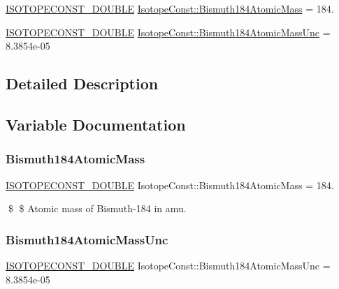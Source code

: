 \begin{DoxyCompactItemize}
\item 
\mbox{\hyperlink{group___isotope_const-_macros_ga8f45a7272ce02c0b4c65c44636ed719a}{I\+S\+O\+T\+O\+P\+E\+C\+O\+N\+S\+T\+\_\+\+D\+O\+U\+B\+LE}} \mbox{\hyperlink{group___isotope_const-_bismuth-_bi184_gabecca31c4b417fb3d773e23a5566c901}{Isotope\+Const\+::\+Bismuth184\+Atomic\+Mass}} = 184.
\item 
\mbox{\hyperlink{group___isotope_const-_macros_ga8f45a7272ce02c0b4c65c44636ed719a}{I\+S\+O\+T\+O\+P\+E\+C\+O\+N\+S\+T\+\_\+\+D\+O\+U\+B\+LE}} \mbox{\hyperlink{group___isotope_const-_bismuth-_bi184_ga72a53833d639a00bd741bbc23bdc1091}{Isotope\+Const\+::\+Bismuth184\+Atomic\+Mass\+Unc}} = 8.\+3854e-\/05
\end{DoxyCompactItemize}


\subsection{Detailed Description}


\subsection{Variable Documentation}
\mbox{\label{group___isotope_const-_bismuth-_bi184_gabecca31c4b417fb3d773e23a5566c901}} 
\subsubsection{\texorpdfstring{Bismuth184\+Atomic\+Mass}{Bismuth184AtomicMass}}
{\footnotesize\ttfamily \mbox{\hyperlink{group___isotope_const-_macros_ga8f45a7272ce02c0b4c65c44636ed719a}{I\+S\+O\+T\+O\+P\+E\+C\+O\+N\+S\+T\+\_\+\+D\+O\+U\+B\+LE}} Isotope\+Const\+::\+Bismuth184\+Atomic\+Mass = 184.}

\$ \$ Atomic mass of Bismuth-\/184 in amu. \mbox{\label{group___isotope_const-_bismuth-_bi184_ga72a53833d639a00bd741bbc23bdc1091}} 
\subsubsection{\texorpdfstring{Bismuth184\+Atomic\+Mass\+Unc}{Bismuth184AtomicMassUnc}}
{\footnotesize\ttfamily \mbox{\hyperlink{group___isotope_const-_macros_ga8f45a7272ce02c0b4c65c44636ed719a}{I\+S\+O\+T\+O\+P\+E\+C\+O\+N\+S\+T\+\_\+\+D\+O\+U\+B\+LE}} Isotope\+Const\+::\+Bismuth184\+Atomic\+Mass\+Unc = 8.\+3854e-\/05}


